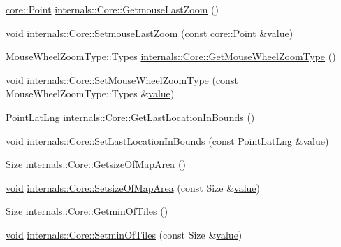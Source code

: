 \begin{DoxyCompactItemize}
\item 
\hyperlink{structcore_1_1_point}{core\-::\-Point} \hyperlink{group___o_p_map_widget_gac8e4aec0ad2357d32955a5cd6896d330}{internals\-::\-Core\-::\-Getmouse\-Last\-Zoom} ()
\item 
\hyperlink{group___u_a_v_objects_plugin_ga444cf2ff3f0ecbe028adce838d373f5c}{void} \hyperlink{group___o_p_map_widget_ga04c566589849ca7f9b3357accf403a55}{internals\-::\-Core\-::\-Setmouse\-Last\-Zoom} (const \hyperlink{structcore_1_1_point}{core\-::\-Point} \&\hyperlink{glext_8h_aa0e2e9cea7f208d28acda0480144beb0}{value})
\item 
Mouse\-Wheel\-Zoom\-Type\-::\-Types \hyperlink{group___o_p_map_widget_gaaf45ca5113dc967072f68d3785b6089b}{internals\-::\-Core\-::\-Get\-Mouse\-Wheel\-Zoom\-Type} ()
\item 
\hyperlink{group___u_a_v_objects_plugin_ga444cf2ff3f0ecbe028adce838d373f5c}{void} \hyperlink{group___o_p_map_widget_ga605f19f8d878c649a0c0fe7aefde25c7}{internals\-::\-Core\-::\-Set\-Mouse\-Wheel\-Zoom\-Type} (const Mouse\-Wheel\-Zoom\-Type\-::\-Types \&\hyperlink{glext_8h_aa0e2e9cea7f208d28acda0480144beb0}{value})
\item 
Point\-Lat\-Lng \hyperlink{group___o_p_map_widget_ga9869340265138d874099cdffed04d95a}{internals\-::\-Core\-::\-Get\-Last\-Location\-In\-Bounds} ()
\item 
\hyperlink{group___u_a_v_objects_plugin_ga444cf2ff3f0ecbe028adce838d373f5c}{void} \hyperlink{group___o_p_map_widget_ga49e6ed17c97e596b9fb3103b63816212}{internals\-::\-Core\-::\-Set\-Last\-Location\-In\-Bounds} (const Point\-Lat\-Lng \&\hyperlink{glext_8h_aa0e2e9cea7f208d28acda0480144beb0}{value})
\item 
Size \hyperlink{group___o_p_map_widget_gafbcd83a2c5548f22c6cbb52a09ff402d}{internals\-::\-Core\-::\-Getsize\-Of\-Map\-Area} ()
\item 
\hyperlink{group___u_a_v_objects_plugin_ga444cf2ff3f0ecbe028adce838d373f5c}{void} \hyperlink{group___o_p_map_widget_ga2e491fd5e0849b99f2d9d180c71cb68d}{internals\-::\-Core\-::\-Setsize\-Of\-Map\-Area} (const Size \&\hyperlink{glext_8h_aa0e2e9cea7f208d28acda0480144beb0}{value})
\item 
Size \hyperlink{group___o_p_map_widget_gaa4181b7edf2df8de57265234f1068b67}{internals\-::\-Core\-::\-Getmin\-Of\-Tiles} ()
\item 
\hyperlink{group___u_a_v_objects_plugin_ga444cf2ff3f0ecbe028adce838d373f5c}{void} \hyperlink{group___o_p_map_widget_gaf34f47548612f5dcf275002aa9b3466c}{internals\-::\-Core\-::\-Setmin\-Of\-Tiles} (const Size \&\hyperlink{glext_8h_aa0e2e9cea7f208d28acda0480144beb0}{value})

\end{DoxyCompactItemize}
